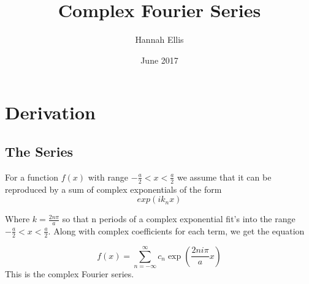 \documentclass[11pt,twoside,a4paper]{book}
\begin{document}
\title{Complex Fourier Series}
\author{Hannah Ellis}
\date{June 2017}
\maketitle
\tableofcontents
\chapter{Derivation}

\section{The Series}
For a function $f(x)$ with range $-\frac{a}{2}<x<\frac{a}{2}$ we assume that it can
be reproduced by a sum of complex exponentials of the form
\begin{equation}
exp(i k_n x)
\end{equation}

Where $k=\frac{2n\pi}{a}$ so that n periods of a complex exponential fit's into
the range $-\frac{a}{2}<x<\frac{a}{2}$. Along with complex coefficients for each
term, we get the equation

\begin{equation}
\label{eq:cfs}
f(x)=\sum_{n=-\infty}^{\infty} c_n \exp\left(\frac{2ni\pi}{a}x\right)
\end{equation}
This is the complex Fourier series.
\end{document}
